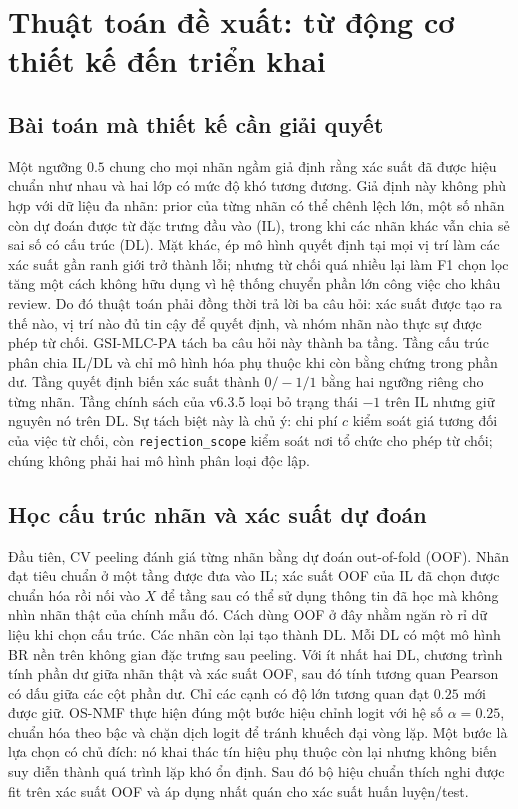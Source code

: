 \documentclass[11pt,a4paper,twoside]{article}
\begin{document}
\section{Thuật toán đề xuất: từ động cơ thiết kế đến triển khai}
\subsection{Bài toán mà thiết kế cần giải quyết}
Một ngưỡng $0.5$ chung cho mọi nhãn ngầm giả định rằng xác suất đã được hiệu chuẩn như nhau và hai lớp có mức độ khó tương đương. Giả định này không phù hợp với dữ liệu đa nhãn: prior của từng nhãn có thể chênh lệch lớn, một số nhãn còn dự đoán được từ đặc trưng đầu vào (IL), trong khi các nhãn khác vẫn chia sẻ sai số có cấu trúc (DL). Mặt khác, ép mô hình quyết định tại mọi vị trí làm các xác suất gần ranh giới trở thành lỗi; nhưng từ chối quá nhiều lại làm F1 chọn lọc tăng một cách không hữu dụng vì hệ thống chuyển phần lớn công việc cho khâu review. Do đó thuật toán phải đồng thời trả lời ba câu hỏi: xác suất được tạo ra thế nào, vị trí nào đủ tin cậy để quyết định, và nhóm nhãn nào thực sự được phép từ chối.
GSI-MLC-PA tách ba câu hỏi này thành ba tầng. Tầng cấu trúc phân chia IL/DL và chỉ mô hình hóa phụ thuộc khi còn bằng chứng trong phần dư. Tầng quyết định biến xác suất thành $0/-1/1$ bằng hai ngưỡng riêng cho từng nhãn. Tầng chính sách của v6.3.5 loại bỏ trạng thái $-1$ trên IL nhưng giữ nguyên nó trên DL. Sự tách biệt này là chủ ý: chi phí $c$ kiểm soát giá tương đối của việc từ chối, còn \texttt{rejection\_scope} kiểm soát nơi tổ chức cho phép từ chối; chúng không phải hai mô hình phân loại độc lập.
\subsection{Học cấu trúc nhãn và xác suất dự đoán}
Đầu tiên, CV peeling đánh giá từng nhãn bằng dự đoán out-of-fold (OOF). Nhãn đạt tiêu chuẩn ở một tầng được đưa vào IL; xác suất OOF của IL đã chọn được chuẩn hóa rồi nối vào $X$ để tầng sau có thể sử dụng thông tin đã học mà không nhìn nhãn thật của chính mẫu đó. Cách dùng OOF ở đây nhằm ngăn rò rỉ dữ liệu khi chọn cấu trúc. Các nhãn còn lại tạo thành DL. Mỗi DL có một mô hình BR nền trên không gian đặc trưng sau peeling.
Với ít nhất hai DL, chương trình tính phần dư giữa nhãn thật và xác suất OOF, sau đó tính tương quan Pearson có dấu giữa các cột phần dư. Chỉ các cạnh có độ lớn tương quan đạt $0.25$ mới được giữ. OS-NMF thực hiện đúng một bước hiệu chỉnh logit với hệ số $\alpha=0.25$, chuẩn hóa theo bậc và chặn dịch logit để tránh khuếch đại vòng lặp. Một bước là lựa chọn có chủ đích: nó khai thác tín hiệu phụ thuộc còn lại nhưng không biến suy diễn thành quá trình lặp khó ổn định. Sau đó bộ hiệu chuẩn thích nghi được fit trên xác suất OOF và áp dụng nhất quán cho xác suất huấn luyện/test.
\end{document}
